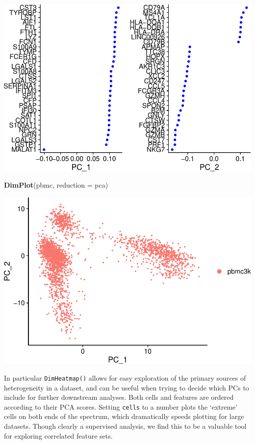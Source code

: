 \documentclass[
]{book}
\newenvironment{Shaded}{\begin{snugshade}}{\end{snugshade}}
\newcommand{\AttributeTok}[1]{\textcolor[rgb]{0.13,0.29,0.53}{#1}}
\newcommand{\FunctionTok}[1]{\textcolor[rgb]{0.13,0.29,0.53}{\textbf{#1}}}
\newcommand{\NormalTok}[1]{#1}
\newcommand{\StringTok}[1]{\textcolor[rgb]{0.31,0.60,0.02}{#1}}
\begin{document}
\includegraphics{scRNAseqInR_Doco_files/figure-latex/pca_viz-1.pdf}

\begin{Shaded}
\begin{Highlighting}[]
\FunctionTok{DimPlot}\NormalTok{(pbmc, }\AttributeTok{reduction =} \StringTok{\textquotesingle{}pca\textquotesingle{}}\NormalTok{)}
\end{Highlighting}
\end{Shaded}

\includegraphics{scRNAseqInR_Doco_files/figure-latex/pca_viz-2.pdf}

In particular \texttt{DimHeatmap()} allows for easy exploration of the primary sources of heterogeneity in a dataset, and can be useful when trying to decide which PCs to include for further downstream analyses. Both cells and features are ordered according to their PCA scores. Setting \texttt{cells} to a number plots the `extreme' cells on both ends of the spectrum, which dramatically speeds plotting for large datasets. Though clearly a supervised analysis, we find this to be a valuable tool for exploring correlated feature sets.
\end{document}
